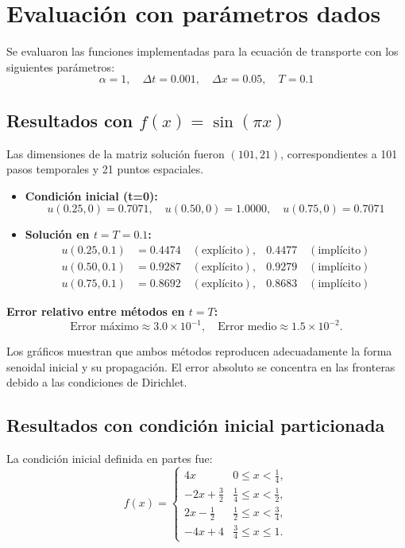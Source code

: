 \documentclass[12pt,a4paper]{article}
\begin{document}
\section{Evaluación con parámetros dados}

Se evaluaron las funciones implementadas para la ecuación de transporte con los siguientes parámetros:
\[
\alpha = 1, \quad \Delta t = 0.001, \quad \Delta x = 0.05, \quad T = 0.1
\]

\subsection{Resultados con $f(x) = \sin(\pi x)$}

Las dimensiones de la matriz solución fueron $(101,21)$, correspondientes a 101 pasos temporales y 21 puntos espaciales.

\begin{itemize}
    \item \textbf{Condición inicial (t=0):}
    \[
    u(0.25,0) = 0.7071, \quad u(0.50,0) = 1.0000, \quad u(0.75,0) = 0.7071
    \]

    \item \textbf{Solución en $t = T = 0.1$:}
    \begin{align*}
    u(0.25,0.1) &= 0.4474 \quad (\text{explícito}), & 0.4477 \quad (\text{implícito}) \\
    u(0.50,0.1) &= 0.9287 \quad (\text{explícito}), & 0.9279 \quad (\text{implícito}) \\
    u(0.75,0.1) &= 0.8692 \quad (\text{explícito}), & 0.8683 \quad (\text{implícito})
    \end{align*}
\end{itemize}

\textbf{Error relativo entre métodos en $t=T$:}
\[
\text{Error máximo} \approx 3.0 \times 10^{-1}, \quad \text{Error medio} \approx 1.5 \times 10^{-2}.
\]

Los gráficos muestran que ambos métodos reproducen adecuadamente la forma senoidal inicial y su propagación.  
El error absoluto se concentra en las fronteras debido a las condiciones de Dirichlet.

\subsection{Resultados con condición inicial particionada}

La condición inicial definida en partes fue:
\[
f(x) =
\begin{cases}
4x & 0 \leq x < \tfrac{1}{4}, \\
-2x + \tfrac{3}{2} & \tfrac{1}{4} \leq x < \tfrac{1}{2}, \\
2x - \tfrac{1}{2} & \tfrac{1}{2} \leq x < \tfrac{3}{4}, \\
-4x + 4 & \tfrac{3}{4} \leq x \leq 1.
\end{cases}
\]
\end{document}
